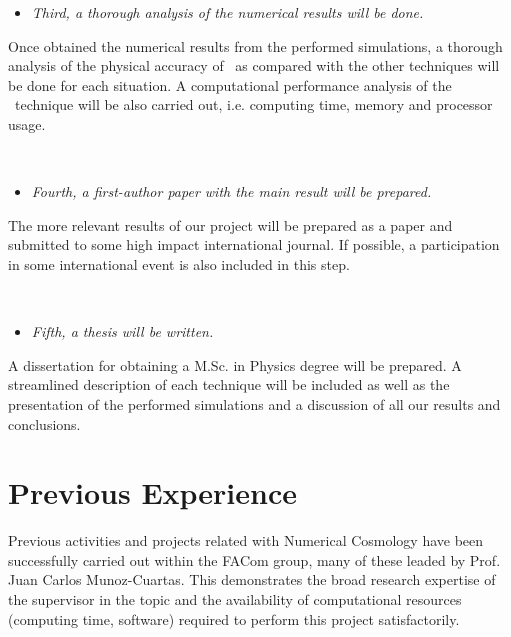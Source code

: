 \documentclass[a4,useAMS,usenatbib,usegraphicx,12pt]{article}
\begin{document}
\begin{itemize}
\item[\checkmark] \textit{Third, a thorough analysis of the numerical results 
will be done.}
\end{itemize}


Once obtained the numerical results from the performed simulations, a thorough
analysis of the physical accuracy of \VPH\ as compared with the other techniques
will be done for each situation. A computational performance analysis of the 
\VPH\ technique will be also carried out, i.e. computing time, memory and 
processor usage.

\

\begin{itemize}
\item[\checkmark] \textit{Fourth, a first-author paper with the main result will
be prepared.}
\end{itemize}


The more relevant results of our project will be prepared as a paper and 
submitted to some high impact international journal. If possible, a participation
in some international event is also included in this step.

\

\begin{itemize}
\item[\checkmark] \textit{Fifth, a thesis will be written.}
\end{itemize}


A dissertation for obtaining a M.Sc. in Physics degree will be prepared. A
streamlined description of each technique will be included as well as the 
presentation of the performed simulations and a discussion of all our results
and conclusions.


\section{Previous Experience}
Previous activities and projects related with Numerical Cosmology have been 
successfully carried out within the FACom group, many of these leaded by Prof. 
Juan Carlos Munoz-Cuartas. This demonstrates the broad research expertise of the 
supervisor in the topic and the availability of computational resources (computing
time, software) required to perform this project satisfactorily.
\end{document}
